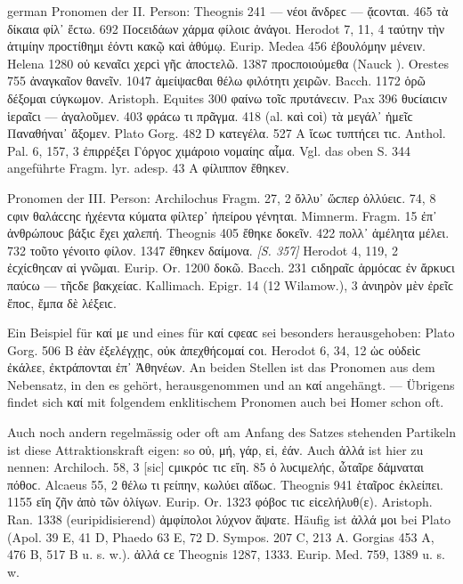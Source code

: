 \begin{otherlanguage*}{german}
Pronomen der II. Person: Theognis 241  — νέοι ἄνδρεϲ — ᾄϲονται. 465  τὰ δίκαια φίλ᾽ ἔϲτω. 692  Ποϲειδάων χάρμα φίλοιϲ ἀνάγοι. Herodot 7, 11, 4  ταύτην τὴν ἀτιμίην προϲτίθημι ἐόντι κακῷ καὶ ἀθύμῳ. Eurip. Medea 456  ἐβουλόμην μένειν. Helena 1280  οὐ κεναῖϲι χερϲὶ γῆϲ ἀποϲτελῶ. 1387  προϲποιούμεθα (Nauck ). Orestes 755  ἀναγκαῖον θανεῖν. 1047  ἀμείψαϲθαι θέλω φιλότητι χειρῶν. Bacch. 1172 ὁρῶ  δέξομαι ϲύγκωμον. Aristoph. Equites 300  φαίνω τοῖϲ πρυτάνεϲιν. Pax 396  θυϲίαιϲιν ἱεραῖϲι — ἀγαλοῦμεν. 403  φράϲω τι πρᾶγμα. 418  (al. καὶ ϲοὶ) τὰ μεγάλ᾽ ἡμεῖϲ Παναθήναι᾽ ἄξομεν. Plato Gorg. 482 D  κατεγέλα. 527 Α  ἴϲωϲ τυπτήϲει τιϲ. Anthol. Pal. 6, 157, 3  ἐπιρρέξει Γόργοϲ χιμάροιο νομαίηϲ αἷμα. Vgl. das oben S. 344 angeführte Fragm. lyr. adesp. 43 A  φίλιππον ἔθηκεν.

Pronomen der III. Person: Archilochus Fragm. 27, 2  ὄλλυ᾽ ὥϲπερ ὀλλύειϲ. 74, 8  ϲφιν θαλάϲϲηϲ ἠχέεντα κύματα φίλτερ᾽ ἠπείρου γένηται. Mimnerm. Fragm. 15  ἐπ᾽ ἀνθρώπουϲ βάξιϲ ἔχει χαλεπή. Theognis 405  ἔθηκε δοκεῖν. 422  πολλ᾽ ἀμέλητα μέλει. 732  τοῦτο γένοιτο φίλον. 1347  ἔθηκεν δαίμονα. \hypertarget{p357}{\emph{[S. 357]}}\label{p357} Herodot 4, 119, 2  ἐϲ\-χίϲ\-θη\-ϲαν αἱ γνῶμαι. Eurip. Or. 1200  δοκῶ. Bacch. 231  ϲιδηραῖϲ ἁρμόϲαϲ ἐν ἄρκυϲι παύϲω — τῆϲδε βακχείαϲ. Kallimach. Epigr. 14 (12 Wilamow.), 3  ἀνιηρὸν μὲν ἐρεῖϲ ἔποϲ, ἔμπα δὲ λέξειϲ.

Ein Beispiel für καί με und eines für καί ϲφεαϲ sei besonders herausgehoben: Plato Gorg. 506 B  ἐὰν ἐξελέγχῃϲ, οὐκ ἀπεχθήϲομαί ϲοι. Herodot 6, 34, 12  ὡϲ οὐδεὶϲ ἐκάλεε, ἐκτράπονται ἐπ᾽ Ἀθηνέων. An beiden Stellen ist das Pronomen aus dem Nebensatz, in den es gehört, herausgenommen und an καί angehängt. — Übrigens findet sich καί mit folgendem enklitischem Pronomen auch bei Homer schon oft.

Auch noch andern regelmässig oder oft am Anfang des Satzes stehenden Partikeln ist diese Attraktionskraft eigen: so οὐ, μή, γάρ, εἰ, ἐάν. Auch ἀλλά ist hier zu nennen: Archiloch. 58, 3  [sic] ϲμικρόϲ τιϲ εἴη. 85  ὁ λυϲιμελήϲ, ὦταῖρε δάμναται πόθοϲ. Alcaeus 55, 2 θέλω τι ϝείπην,  κωλύει αἴδωϲ. Theognis 941  ἑταῖροϲ ἐκλείπει. 1155  εἴη ζῆν ἀπὸ τῶν ὀλίγων. Eurip. Or. 1323  φόβοϲ τιϲ εἰϲελήλυθ(ε). Aristoph. Ran. 1338 (euripidisierend)  ἀμφίπολοι λύχνον ἅψατε. Häufig ist ἀλλά μοι bei Plato (Apol. 39 Ε, 41 D, Phaedo 63 E, 72 D. Sympos. 207 C, 213 A. Gorgias 453 A, 476 B, 517 B u. s. w.). ἀλλά ϲε Theognis 1287, 1333. Eurip. Med. 759, 1389 u. s. w.


\end{otherlanguage*}
